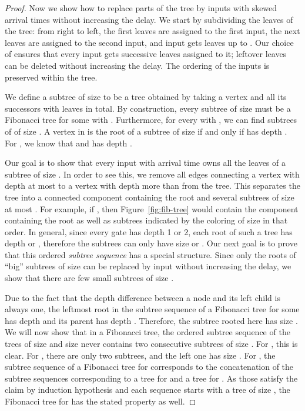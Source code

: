 \documentclass[11pt,final,microtype]{scrartcl}
\theoremstyle{plain}
\theoremstyle{definition}
\theoremstyle{remark}
\begin{document}
\begin{proof}
  Now we show how to replace parts of the tree by inputs with skewed
  arrival times  without increasing the delay. We
  start by subdividing the leaves of the tree: from right to left, the
  first  leaves are assigned to the first input, the next
   leaves are assigned to the second input, and input 
  gets leaves  up to . Our choice of  ensures that every input 
  gets  successive leaves assigned to it; leftover
  leaves can be deleted without increasing the delay. The ordering of
  the inputs is preserved within the tree.

  We define a subtree of size  to be a tree obtained by taking a
  vertex  and all its successors with  leaves in total. By
  construction, every subtree of size  must be a Fibonacci tree for
  some  with . Furthermore, for every  with , we can find subtrees of  of size . A vertex  in 
  is the root of a subtree of size  if and only if  has
  depth . For , we know that  and 
  has depth .

  Our goal is to show that every input  with arrival time 
  owns all the leaves of a subtree of size . In order to
  see this, we remove all edges connecting a vertex with depth at most
   to a vertex with depth more than  from the tree. This
  separates the tree into a connected component containing the root
  and several subtrees of size at most . For example, if
  , then Figure~\ref{fig:fib-tree} would contain the
  component containing the root as well as subtrees indicated by the
  coloring of size  in that order. In general, since every
  gate has depth 1 or 2, each root of such a tree has depth  or
  , therefore the subtrees can only have size 
  or . Our next goal is to prove that this ordered
  \emph{subtree sequence} has a special structure. Since only the
  roots of ``big'' subtrees of size  can be replaced by
  input  without increasing the delay, we show that there are few
  small subtrees of size .

  Due to the fact that the depth difference between a node and its
  left child is always one, the leftmost root in the subtree sequence
  of a Fibonacci tree for some  has depth  and its
  parent has depth . Therefore, the subtree rooted here has
  size . We will now show that in a Fibonacci tree, the
  ordered subtree sequence of the trees of size  and size
   never contains two consecutive subtrees of size
  . For , this is clear. For ,
  there are only two subtrees, and the left one has size
  . For , the subtree sequence of a Fibonacci
  tree for  corresponds to the concatenation of the subtree
  sequences corresponding to a tree for  and a tree for . As
  those satisfy the claim by induction hypothesis and each sequence
  starts with a tree of size , the Fibonacci tree for 
  has the stated property as well.


\end{proof}
\end{document}
